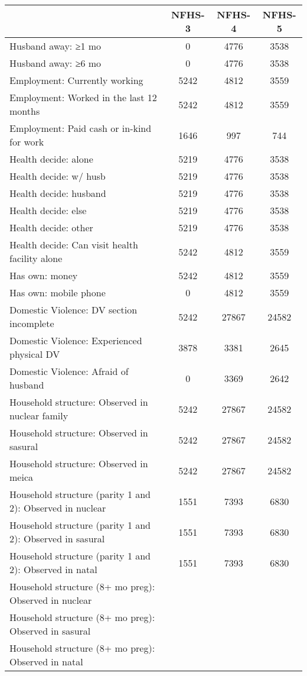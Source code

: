 \begin{tabular}{l*{3}{c}}
\toprule
            &\multicolumn{1}{c}{NFHS-3}&\multicolumn{1}{c}{NFHS-4}&\multicolumn{1}{c}{NFHS-5}\\
\midrule
\midrule
Husband away: ≥1 mo&           0&        4776&        3538\\
Husband away: ≥6 mo&           0&        4776&        3538\\
Employment: Currently working&        5242&        4812&        3559\\
Employment: Worked in the last 12 months&        5242&        4812&        3559\\
Employment: Paid cash or in-kind for work&        1646&         997&         744\\
Health decide: alone&        5219&        4776&        3538\\
Health decide: w/ husb&        5219&        4776&        3538\\
Health decide: husband&        5219&        4776&        3538\\
Health decide: else&        5219&        4776&        3538\\
Health decide: other&        5219&        4776&        3538\\
Health decide: Can visit health facility alone&        5242&        4812&        3559\\
Has own: money&        5242&        4812&        3559\\
Has own: mobile phone&           0&        4812&        3559\\
Domestic Violence: DV section incomplete&        5242&       27867&       24582\\
Domestic Violence: Experienced physical DV&        3878&        3381&        2645\\
Domestic Violence: Afraid of husband&           0&        3369&        2642\\
Household structure: Observed in nuclear family&        5242&       27867&       24582\\
Household structure: Observed in sasural&        5242&       27867&       24582\\
Household structure: Observed in meica&        5242&       27867&       24582\\
Household structure (parity 1 and 2): Observed in nuclear&        1551&        7393&        6830\\
Household structure (parity 1 and 2): Observed in sasural&        1551&        7393&        6830\\
Household structure (parity 1 and 2): Observed in natal&        1551&        7393&        6830\\
Household structure (8+ mo preg): Observed in nuclear&            &            &            \\
Household structure (8+ mo preg): Observed in sasural&            &            &            \\
Household structure (8+ mo preg): Observed in natal&            &            &            \\
\bottomrule
\end{tabular}

